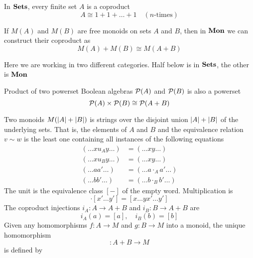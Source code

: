 \documentclass[11pt]{article}
\begin{document}
In \(\operatorname{\textbf{Sets}}\), every finite set \(A\) is a coproduct
\begin{equation*}
A\cong1+1+\dots+1\quad(n\text{-times})
\end{equation*}
\begin{examplle}[]
If \(M(A)\) and \(M(B)\) are free monoids on sets \(A\) and \(B\), then in
\(\operatorname{\textbf{Mon}}\) we can construct their coproduct as
\begin{equation*}
M(A)+M(B)\cong M(A+B)
\end{equation*}

\begin{center}\end{center}
Here we are working in two different categories. Half below is in \(\operatorname{\textbf{Sets}}\),
the other is \(\operatorname{\textbf{Mon}}\)
\end{examplle}

Product of two powerset Boolean algebras \(\mathcal{P}(A)\) and \(\mathcal{P}(B)\) is
also a powerset
\begin{equation*}
\mathcal{P}(A)\times\mathcal{P}(B)\cong\mathcal{P}(A+B)
\end{equation*}  
\begin{examplle}[]
Two monoids \(M(\abs{A}+\abs{B})\) is strings over the disjoint union
\(\abs{A}+\abs{B}\) of the underlying sets. That is, the elements of \(A\)
and \(B\) and the equivalence relation \(v\sim w\) is the least one
containing all instances of the following equations
\begin{align*}
(\dots xu_Ay\dots)&=(\dots xy\dots)\\
(\dots xu_By\dots)&=(\dots xy\dots)\\
(\dots aa'\dots)&=(\dots a\cdot_A a'\dots)\\
(\dots bb'\dots)&=(\dots b\cdot_B b'\dots)
\end{align*}
The unit is the equivalence class \([-]\) of the empty word. Multiplication
is
\begin{equation*}
[x\dots y]\cdot[x'\dots y']=[x\dots yx'\dots y']
\end{equation*}
The coproduct injections \(i_A:A\to A+B\) and \(i_B:B\to A+B\) are
\begin{equation*}
i_A(a)=[a],\quad i_B(b)=[b]
\end{equation*}
Given any homomorphisms \(f:A\to M\) and \(g:B\to M\) into a monoid, the
unique homomorphism
\begin{equation*}
[f,g]:A+B\to M
\end{equation*}
is defined by
\begin{center}\end{center}
\end{examplle}
\end{document}

